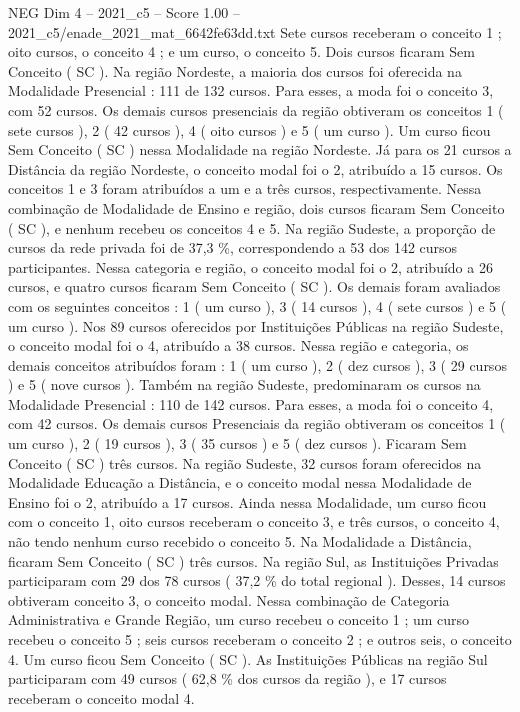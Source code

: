 \begin{textsample}{NEG Dim 4 – 2021\_c5 – Score 1.00 – 2021\_c5/enade\_2021\_mat\_6642fe63dd.txt}
Sete cursos receberam o conceito 1 ; oito cursos, o conceito 4 ; e um curso, o conceito 5.
Dois cursos ficaram Sem Conceito ( SC ).
Na região Nordeste, a maioria dos cursos foi oferecida na Modalidade Presencial : 111 de 132 cursos.
Para esses, a moda foi o conceito 3, com 52 cursos.
Os demais cursos presenciais da região obtiveram os conceitos 1 ( sete cursos ), 2 ( 42 cursos ), 4 ( oito cursos ) e 5 ( um curso ).
Um curso ficou Sem Conceito ( SC ) nessa Modalidade na região Nordeste.
Já para os 21 cursos a Distância da região Nordeste, o conceito modal foi o 2, atribuído a 15 cursos.
Os conceitos 1 e 3 foram atribuídos a um e a três cursos, respectivamente.
Nessa combinação de Modalidade de Ensino e região, dois cursos ficaram Sem Conceito ( SC ), e nenhum recebeu os conceitos 4 e 5.
Na região Sudeste, a proporção de cursos da rede privada foi de 37,3 \%, correspondendo a 53 dos 142 cursos participantes.
Nessa categoria e região, o conceito modal foi o 2, atribuído a 26 cursos, e quatro cursos ficaram Sem Conceito ( SC ).
Os demais foram avaliados com os seguintes conceitos : 1 ( um curso ), 3 ( 14 cursos ), 4 ( sete cursos ) e 5 ( um curso ).
Nos 89 cursos oferecidos por Instituições Públicas na região Sudeste, o conceito modal foi o 4, atribuído a 38 cursos.
Nessa região e categoria, os demais conceitos atribuídos foram : 1 ( um curso ), 2 ( dez cursos ), 3 ( 29 cursos ) e 5 ( nove cursos ).
Também na região Sudeste, predominaram os cursos na Modalidade Presencial : 110 de 142 cursos.
Para esses, a moda foi o conceito 4, com 42 cursos.
Os demais cursos Presenciais da região obtiveram os conceitos 1 ( um curso ), 2 ( 19 cursos ), 3 ( 35 cursos ) e 5 ( dez cursos ).
Ficaram Sem Conceito ( SC ) três cursos.
Na região Sudeste, 32 cursos foram oferecidos na Modalidade Educação a Distância, e o conceito modal nessa Modalidade de Ensino foi o 2, atribuído a 17 cursos.
Ainda nessa Modalidade, um curso ficou com o conceito 1, oito cursos receberam o conceito 3, e três cursos, o conceito 4, não tendo nenhum curso recebido o conceito 5.
Na Modalidade a Distância, ficaram Sem Conceito ( SC ) três cursos.
Na região Sul, as Instituições Privadas participaram com 29 dos 78 cursos ( 37,2 \% do total regional ).
Desses, 14 cursos obtiveram conceito 3, o conceito modal.
Nessa combinação de Categoria Administrativa e Grande Região, um curso recebeu o conceito 1 ; um curso recebeu o conceito 5 ; seis cursos receberam o conceito 2 ; e outros seis, o conceito 4.
Um curso ficou Sem Conceito ( SC ).
As Instituições Públicas na região Sul participaram com 49 cursos ( 62,8 \% dos cursos da região ), e 17 cursos receberam o conceito modal 4.

\end{textsample}
